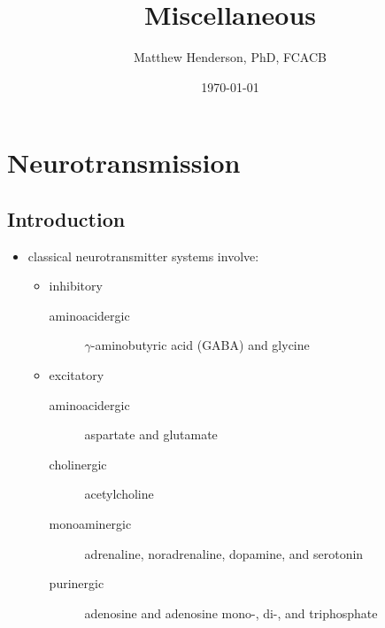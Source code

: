 \documentclass[12pt]{scrartcl}
\author{Matthew Henderson, PhD, FCACB}
\date{\today}
\title{Miscellaneous}
\begin{document}
\maketitle
\setcounter{tocdepth}{2}
\tableofcontents



\section{Neurotransmission}
\label{sec:org473b7e6}
\subsection{Introduction}
\label{sec:orgc047a4f}
\begin{itemize}
\item classical neurotransmitter systems involve:
\begin{itemize}
\item inhibitory
\begin{description}
\item[{aminoacidergic}] \(\gamma\)-aminobutyric acid (GABA) and glycine
\end{description}
\item excitatory
\begin{description}
\item[{aminoacidergic}] aspartate and glutamate
\item[{cholinergic}] acetylcholine
\item[{monoaminergic}] adrenaline, noradrenaline, dopamine, and serotonin
\item[{purinergic}] adenosine and adenosine mono-, di-, and triphosphate
\end{description}
\end{itemize}


\end{itemize}
\end{document}
